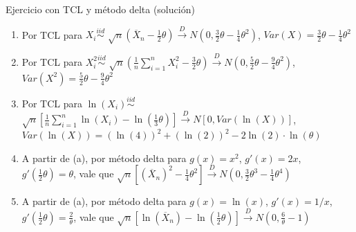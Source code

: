 \documentclass{beamer}
\theoremstyle{definition}
\begin{document}
\begin{frame}{\color{rosee}Ejercicio con TCL y método delta (solución)}\small\color{gray}
    \begin{enumerate}[label=(\alph*),leftmargin=*]
        \item Por TCL para $X_i\stackrel{iid}{\sim}$ $\sqrt{n}\left(\overline{X}_n-\frac{1}{2}\theta \right) \stackrel{D}{\to} N\left(0,\frac{3}{2}\theta-\frac{1}{4}\theta^2\right)$, $Var(X)=\frac{3}{2}\theta-\frac{1}{4}\theta^2$
        \item Por TCL para $X_i^2\stackrel{iid}{\sim}$ $\sqrt{n}\left(\frac{1}{n}\sum_{i=1}^{n}X_i^2-\frac{3}{2}\theta \right) \stackrel{D}{\to} N\left(0,\frac{5}{2}\theta-\frac{9}{4}\theta^2\right)$, $Var(X^2)=\frac{5}{2}\theta-\frac{9}{4}\theta^2$
        \item Por TCL para $\ln(X_i)\stackrel{iid}{\sim}$ $\sqrt{n}\left[\frac{1}{n}\sum_{i=1}^{n}\ln(X_i)-\ln\left(\frac{1}{3}\theta\right) \right]\stackrel{D}{\to} N\left[0,Var(\ln(X))\right]$, $Var(\ln(X))=(\ln(4))^2+(\ln(2))^2-2\ln(2)\cdot \ln(\theta)$
        \item A partir de (a), por método delta para $g(x)=x^2$, $g'(x)=2x$, $g'\left(\frac{1}{2}\theta\right)=\theta$,  vale que $\sqrt{n}\left[(\overline{X}_n)^2-\frac{1}{4}\theta^2 \right]\stackrel{D}{\to}N\left(0,\frac{3}{2}\theta^3-\frac{1}{4}\theta^4\right)$
         \item A partir de (a), por método delta para $g(x)=\ln(x)$, $g'(x)=1/x$, $g'\left(\frac{1}{2}\theta\right)=\frac{2}{\theta}$, vale que $\sqrt{n}\left[\ln(\overline{X}_n)-\ln\left(\frac{1}{2}\theta\right) \right]\stackrel{D}{\to}N\left(0,\frac{6}{\theta}-1\right)$
    \end{enumerate}
\end{frame}
\end{document}
